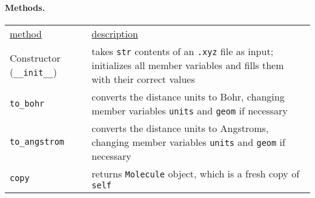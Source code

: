 \documentclass[fleqn]{article}
\newcommand{\linl}[1]{\lstinline{#1}{}}
\newcommand{\ul}[1]{\underline{#1}}
\begin{document}
\paragraph{Methods.}
\begin{center}
\begin{tabular}{p{}@{}p{}}
  \ul{method} & \ul{description}\\
  Constructor (\linl{__init__})
  & takes \linl{str} contents of an \linl{.xyz} file as input; initializes all member variables and fills them with their correct values\\
  \linl{to_bohr}
  & converts the distance units to Bohr, changing member variables \linl{units} and \linl{geom} if necessary \\
  \linl{to_angstrom}
  & converts the distance units to Angstroms, changing member variables \linl{units} and \linl{geom} if necessary \\
  \linl{copy}
  & returns \linl{Molecule} object, which is a fresh copy of \linl{self}
\end{tabular}
\end{center}
\end{document}
